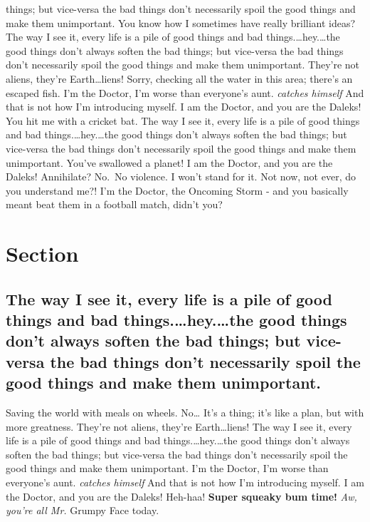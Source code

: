 things; but vice-versa the bad things don't necessarily spoil the good
things and make them unimportant. You know how I sometimes have really
brilliant ideas? The way I see it, every life is a pile of good things
and bad things.\ldots{}hey.\ldots{}the good things don't always soften
the bad things; but vice-versa the bad things don't necessarily spoil
the good things and make them unimportant. They're not aliens, they're
Earth\ldots{}liens! Sorry, checking all the water in this area; there's
an escaped fish. I'm the Doctor, I'm worse than everyone's aunt.
\emph{catches himself} And that is not how I'm introducing myself. I am
the Doctor, and you are the Daleks! You hit me with a cricket bat. The
way I see it, every life is a pile of good things and bad
things.\ldots{}hey.\ldots{}the good things don't always soften the bad
things; but vice-versa the bad things don't necessarily spoil the good
things and make them unimportant. You've swallowed a planet! I am the
Doctor, and you are the Daleks! Annihilate? No.~No violence. I won't
stand for it. Not now, not ever, do you understand me?! I'm the Doctor,
the Oncoming Storm - and you basically meant beat them in a football
match, didn't you?

\hypertarget{section-3.2}{%
\section{Section}\label{section-3.2}}

\hypertarget{the-way-i-see-it-every-life-is-a-pile-of-good-things-and-bad-things.hey.the-good-things-dont-always-soften-the-bad-things-but-vice-versa-the-bad-things-dont-necessarily-spoil-the-good-things-and-make-them-unimportant.}{%
\subsection{The way I see it, every life is a pile of good things and
bad things.\ldots{}hey.\ldots{}the good things don't always soften the
bad things; but vice-versa the bad things don't necessarily spoil the
good things and make them
unimportant.}\label{the-way-i-see-it-every-life-is-a-pile-of-good-things-and-bad-things.hey.the-good-things-dont-always-soften-the-bad-things-but-vice-versa-the-bad-things-dont-necessarily-spoil-the-good-things-and-make-them-unimportant.}}

Saving the world with meals on wheels. No\ldots{} It's a thing; it's
like a plan, but with more greatness. They're not aliens, they're
Earth\ldots{}liens! The way I see it, every life is a pile of good
things and bad things.\ldots{}hey.\ldots{}the good things don't always
soften the bad things; but vice-versa the bad things don't necessarily
spoil the good things and make them unimportant. I'm the Doctor, I'm
worse than everyone's aunt. \emph{catches himself} And that is not how
I'm introducing myself. I am the Doctor, and you are the Daleks!
Heh-haa! \textbf{Super squeaky bum time!} \emph{Aw, you're all Mr.}
Grumpy Face today.

